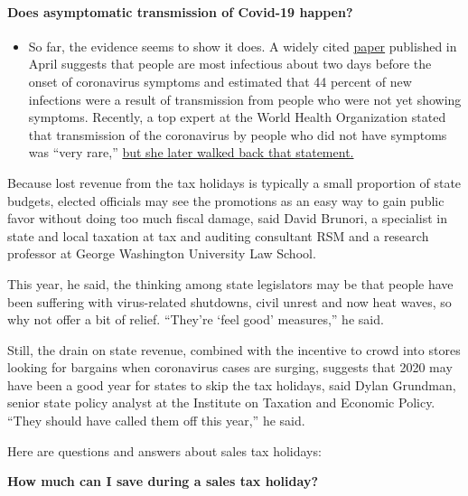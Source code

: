 \begin{itemize}
{  \paragraph{Does asymptomatic transmission of Covid-19
  happen?}\label{does-asymptomatic-transmission-of-covid-19-happen}}

  \begin{itemize}
  \tightlist
  \item
    So far, the evidence seems to show it does. A widely cited
    \href{https://www.nature.com/articles/s41591-020-0869-5}{paper}
    published in April suggests that people are most infectious about
    two days before the onset of coronavirus symptoms and estimated that
    44 percent of new infections were a result of transmission from
    people who were not yet showing symptoms. Recently, a top expert at
    the World Health Organization stated that transmission of the
    coronavirus by people who did not have symptoms was ``very rare,''
    \href{https://www.nytimes3xbfgragh.onion/2020/06/09/world/coronavirus-updates.html?action=click\&pgtype=Article\&state=default\&region=MAIN_CONTENT_3\&context=storylines_faq\#link-1f302e21}{but
    she later walked back that statement.}
  \end{itemize}
\end{itemize}

Because lost revenue from the tax holidays is typically a small
proportion of state budgets, elected officials may see the promotions as
an easy way to gain public favor without doing too much fiscal damage,
said David Brunori, a specialist in state and local taxation at tax and
auditing consultant RSM and a research professor at George Washington
University Law School.

This year, he said, the thinking among state legislators may be that
people have been suffering with virus-related shutdowns, civil unrest
and now heat waves, so why not offer a bit of relief. ``They're `feel
good' measures,'' he said.

Still, the drain on state revenue, combined with the incentive to crowd
into stores looking for bargains when coronavirus cases are surging,
suggests that 2020 may have been a good year for states to skip the tax
holidays, said Dylan Grundman, senior state policy analyst at the
Institute on Taxation and Economic Policy. ``They should have called
them off this year,'' he said.

Here are questions and answers about sales tax holidays:

\textbf{How much can I save during a sales tax holiday?}

